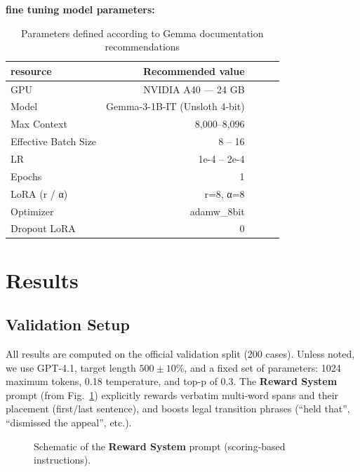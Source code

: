 \documentclass[sigconf]{acmart}
\begin{document}
\textbf{fine tuning model parameters:}
\begin{table}[h!]
\centering
\small
\begin{tabular}{lrrrr}
\toprule
\textbf{resource} & \textbf{Recommended value}\\
\midrule
GPU & NVIDIA A40 — 24 GB\\
Model & Gemma-3-1B-IT (Unsloth 4-bit)\\
Max Context & 8,000–8,096\\
Effective Batch Size & 8 – 16\\
LR & 1e-4 – 2e-4\\
Epochs & 1\\
LoRA (r / α) & r=8, α=8\\
Optimizer & adamw_8bit\\
Dropout LoRA & 0\\
\bottomrule
\end{tabular}
\caption{Parameters defined according to Gemma documentation recommendations}
\label{tab:results}
\end{table}

\section{Results}
\subsection{Validation Setup}
All results are computed on the official validation split (200 cases). Unless noted, we use GPT-4.1, target length $500\pm10\%$, and a fixed set of parameters: 1024 maximum tokens, 0.18 temperature, and top-p of 0.3. The \textbf{Reward System} prompt (from Fig.~\ref{fig:reward}) explicitly rewards verbatim multi-word spans and their placement (first/last sentence), and boosts legal transition phrases (``held that'', ``dismissed the appeal'', etc.).

\begin{figure}[H]
  \centering
  \caption{Schematic of the \textbf{Reward System} prompt (scoring-based instructions).}
  \label{fig:reward}
\end{figure}
\end{document}
